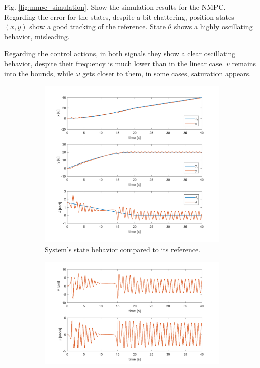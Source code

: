 \documentclass[conference]{IEEEtran}
\begin{document}
Fig. \ref{fig:nmpc_simulation}. Show the simulation results for the NMPC. Regarding the error for the states, despite a bit chattering, position states \((x,y)\) show a good tracking of the reference. State \(\theta\) shows a highly oscillating behavior, misleading.

Regarding the control actions, in both signals they show a clear oscillating behavior, despite their frequency is much lower than in the linear case. \(v\) remains into the bounds, while \(\omega\) gets closer to them, in some cases, saturation appears.

\begin{figure}
\centering
\begin{subfigure}[t]{0.4\textwidth}
\includegraphics[width=1.4\textwidth]{nmpc_states.png}
\caption{\label{fig:nmpcxl}System's state behavior compared to its reference.}
\end{subfigure}
\begin{subfigure}[t]{0.4\textwidth}
\includegraphics[width=1.4\textwidth]{nmpc_control.png}

\end{subfigure}
\end{figure}
\end{document}
